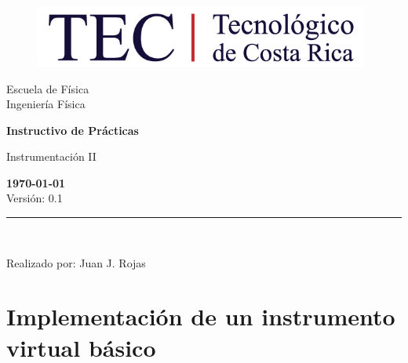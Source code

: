 \documentclass[12pt,letterpaper]{report}
\begin{document}
\begin{titlepage}

\begin{center}
\vspace*{1in}
\begin{figure}[htb]
\begin{center}
\includegraphics[width=11cm]{fig/comunes/logo.png}
\end{center}
\end{figure}
\vspace*{0.4in}
\begin{Large}
Escuela de Física\\
\vspace*{0.15in}
Ingeniería Física\\
\vspace*{0.8in}
\end{Large}
\vspace*{0.2in}
\begin{Large}
\textbf{Instructivo de Prácticas} \\
\end{Large}
\vspace*{0.3in}
\begin{large}
Instrumentación II\\
\end{large}
\vspace*{2.5in}
\begin{Large}
\textbf{\today}\\
Versión: 0.1\\
\end{Large}
\rule{80mm}{0.1mm}\\
\vspace*{0.1in}
\begin{large}
Realizado por: Juan J. Rojas\\
\end{large}
\end{center}

\end{titlepage}

\tableofcontents

\chapter{Implementación de un instrumento virtual básico}
\end{document}
